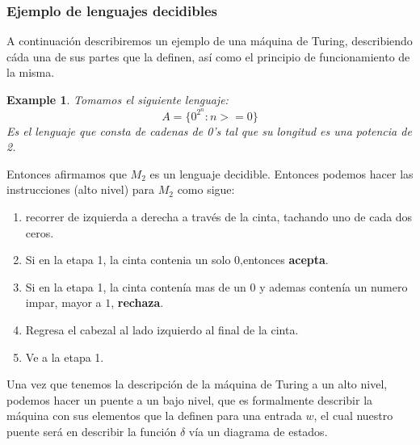 \documentclass[10pt]{report}
\newtheorem{example}{Example}
\begin{document}
    \subsubsection{Ejemplo de lenguajes decidibles}
    A continuación describiremos un ejemplo de una máquina de Turing, describiendo cáda una de sus partes que la definen,
    así como el principio de funcionamiento de la misma.
    \begin{example}
        Tomamos el siguiente lenguaje:
        \begin{equation}
            A = \{ 0^2^n : n>=0\}\label{eq:equation2}
        \end{equation}
        Es el lenguaje que consta de cadenas de 0's tal que su longitud es una
        potencia de 2.
    \end{example}
    Entonces afirmamos que $M_{2}$ es un lenguaje decidible.
    Entonces podemos hacer las instrucciones (alto  nivel) para $M_{2}$ como sigue:
    \begin{enumerate}
        \item recorrer de izquierda a derecha a través de la cinta, tachando uno de cada dos ceros.
        \item Si en la etapa 1, la cinta contenia un solo $0$,entonces \textbf{acepta}.
        \item Si en la etapa 1, la cinta contenía mas de un $0$ y ademas contenía un numero impar, mayor a $1$, \textbf{rechaza}.
        \item Regresa el cabezal al lado izquierdo al final de la cinta.
        \item Ve a la etapa 1.
    \end{enumerate}
    Una vez que tenemos la descripción de la máquina de Turing a un alto nivel, podemos hacer un puente
    a un bajo nivel, que es formalmente describir la máquina con sus elementos que la definen para una entrada $w$,
    el cual nuestro puente será en describir la función $\delta$ vía un diagrama de estados.
\end{document}
